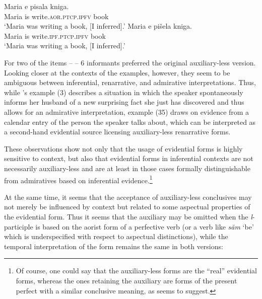 \documentclass[output=paper]{langscibook}
\begin{document}
\ex \label{smirnova:infer-acceptability:alternative1}
\gll Maria e pisala kniga. \\
Maria is write.\textsc{aor.ptcp.ipfv} book\\
\glt `Maria was writing a book, [I inferred].'
\ex \label{smirnova:infer-acceptability:alternative2}
\gll Maria e pišela kniga. \\
Maria is write.\textsc{ipf.ptcp.ipfv} book\\
\glt ‘Maria was writing a book, [I inferred].’
\z

\noindent For two of the items -- \citet[480, (3) and 498, (35)]{Smirnova2013} -- 6 informants preferred the original auxiliary-less version. Looking closer at the contexts of the examples, however, they seem to be ambiguous between inferential, renarrative, and admirative interpretations. Thus, while \citeauthor{Smirnova2013}'s example (3) describes a situation in which the speaker spontaneously informs her husband of a new surprising fact she just has discovered and thus allows for an admirative interpretation, example (35) draws on evidence from a calendar entry of the person the speaker talks about, which can be interpreted as a second-hand evidential source licensing auxiliary-less renarrative forms.

These observations show not only that the usage of  evidential forms is highly sensitive to context, but also that evidential forms in inferential contexts are not necessarily auxiliary-less and are at least in those cases formally distinguishable from admiratives based on inferential evidence.\footnote{Of course, one could say that the auxiliary-less forms are the ``real'' evidential forms, whereas the ones retaining the auxiliary are forms of the present perfect with a similar conclusive meaning, as \citet{Izvorski1997} seems to suggest.}

At the same time, it seems that the acceptance of auxiliary-less conclusives may not merely be influenced by context but related to some aspectual properties of the evidential form. Thus it seems that the auxiliary may be omitted when the \textit{l}-participle is based on the aorist form of a perfective verb (or a verb like \textit{săm} `be' which is underspecified with respect to aspectual distinctions), while the temporal interpretation of the form remains the same in both versions:
\end{document}
